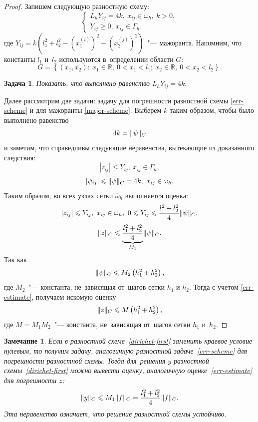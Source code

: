 \documentclass[11pt,a4paper,twoside,listtotoc,bibtotoc]{report}
\numberwithin{equation}{section}
\newtheorem*{problem}{Задача}
\theoremstyle{definition}
\theoremstyle{plain}
\newtheorem*{note*}{Замечание}
\DeclarePairedDelimiter\norm{\lVert}{\rVert}
\begin{document}
\begin{proof}
    Запишем следующую разностную схему:
    \begin{equation}
        \label{major-scheme}
        \begin{cases}
            L_hY_{ij}=4k,~x_{ij}\in\omega_h,~k>0,\\
            Y_{ij} \geqslant 0,~x_{ij}\in\Gamma_h,
        \end{cases}
    \end{equation}
    где $Y_{ij}=k\left(l_1^2+l_2^2-\left(x_1^{(i)}\right)^2-
    \left(x_2^{(j)}\right)^2\right)$~"--- мажоранта. Напомним, что константы $l_1$ и~$l_2$
    используются в~определении области $G$:
    $$
        G = \left\{(x_1, x_2)\colon~x_1 \in \mathbb{R},~0 < x_1 < l_1;
        ~x_2\in\mathbb{R},~0 < x_2 < l_2\right\}.
    $$
    \begin{problem}
        Показать, что выполнено равенство
        $
            L_hY_{ij}=4k.
        $
    \end{problem}
    \noindent
    Далее рассмотрим две задачи: задачу для погрешности разностной схемы \eqref{err-scheme} и
    для мажоранты \eqref{major-scheme}. Выберем $k$ таким образом, чтобы было выполнено равенство
    $$
        4k=\norm{\psi}_C
    $$
    и заметим, что справедливы следующие неравенства, вытекающие из доказанного
    следствия:
    $$
        |z_{ij}| \leqslant Y_{ij},~x_{ij} \in \Gamma_h,
    $$
    $$
        |\psi_{ij}| \leqslant \norm{\psi}_C=4k,~x_{ij}\in\omega_h.
    $$
    Таким образом, во всех узлах сетки $\overline{\omega}_h$ выполняется оценка:
    $$
        |z_{ij}| \leqslant Y_{ij},~x_{ij}\in\overline{\omega}_h,
        ~0 \leqslant Y_{ij} \leqslant \frac{l_1^2+l_2^2}{4}\norm{\psi}_C,
    $$
    \begin{equation}
        \label{err-estimate}
        \norm{z}_C \leqslant \underbrace{\frac{l_1^2+l_2^2}{4}}_{M_1}\norm{\psi}_C.
    \end{equation}
    Так как
    $$
        \norm{\psi}_C \leqslant M_2\left(h_1^2 + h_2^2\right),
    $$
    где $M_2$~"--- константа, не~зависящая от~шагов сетки $h_1$ и $h_2$.
    Тогда с учетом \eqref{err-estimate}, получаем искомую оценку
    $$
        \norm{z}_C \leqslant M\left(h_1^2+h_2^2\right),
    $$
    где $M=M_1M_2$~"--- константа, не~зависящая от~шагов сетки $h_1$ и~$h_2$.
\end{proof}
%
\begin{note*}
    Если в разностной схеме~\eqref{dirichet-first} заменить краевое условие
    нулевым, то получим задачу,
    аналогичную разностной задаче~\eqref{err-scheme} для погрешности разностной схемы.
    Тогда для~решения $y$ разностной схемы~\eqref{dirichet-first}
    можно вывести оценку, аналогичную оценке~\eqref{err-estimate}
    для погрешности $z$:
    $$
        \norm{y}_C \leqslant M_1\norm{f}_C =
            \dfrac{l_1^2 + l_2^2}{4}\norm{f}_C.
    $$
    Эта неравенство означает, что решение разностной схемы устойчиво.

\end{note*}
\end{document}
